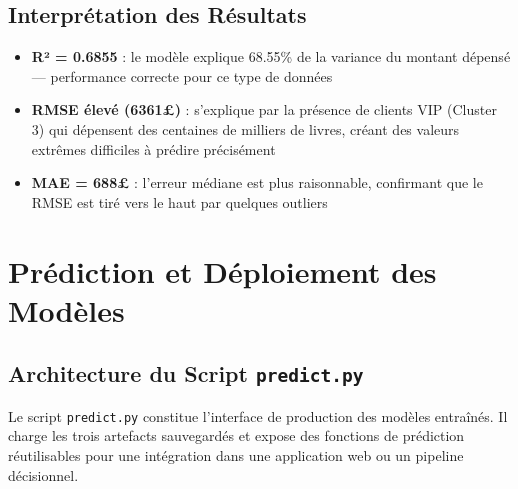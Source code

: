 \documentclass[11pt,a4paper]{article}
\begin{document}
\subsection{Interprétation des Résultats}
\begin{itemize}
	\item \textbf{R² = 0.6855} : le modèle explique 68.55\% de la variance du montant dépensé — performance correcte pour ce type de données
	\item \textbf{RMSE élevé (6361£)} : s'explique par la présence de clients VIP (Cluster 3) qui dépensent des centaines de milliers de livres, créant des valeurs extrêmes difficiles à prédire précisément
	\item \textbf{MAE = 688£} : l'erreur médiane est plus raisonnable, confirmant que le RMSE est tiré vers le haut par quelques outliers
\end{itemize}
\section{Prédiction et Déploiement des Modèles}

\subsection{Architecture du Script \texttt{predict.py}}

Le script \texttt{predict.py} constitue l'interface de production des modèles entraînés. Il charge les trois artefacts sauvegardés et expose des fonctions de prédiction réutilisables pour une intégration dans une application web ou un pipeline décisionnel.
\end{document}
